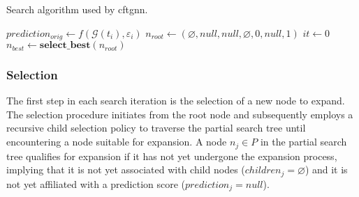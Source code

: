 {
\setlength{\algomargin}{1.25em}
\small
\begin{algorithm}[ht]
\caption{Search algorithm used by \gls{cftgnn}.}
\label{a_CoDy}
    $prediction_{orig} \gets f(\mathcal{G}(t_i), \varepsilon_i)$\;
    $n_{root} \gets (\varnothing, null, null, \varnothing, 0, null, 1)$\;
    $it \gets 0$\;
    \label{a_CoDy_l_while_end}
    $n_{best} \gets \mathrm{\textbf{select\_best}}(n_{root})$\; \label{a_CoDy_l_select_best}
\end{algorithm}
}

\FloatBarrier
\subsubsection{Selection}
\label{s_Methodology_CoDy_Selection}
The first step in each search iteration is the selection of a new node to expand. The selection procedure initiates from the root node and subsequently employs a recursive child selection policy to traverse the partial search tree until encountering a node suitable for expansion. A node $n_j \in P$ in the partial search tree qualifies for expansion if it has not yet undergone the expansion process, implying that it is not yet associated with child nodes ($children_j = \varnothing$) and it is not yet affiliated with a prediction score ($prediction_j = null$).

